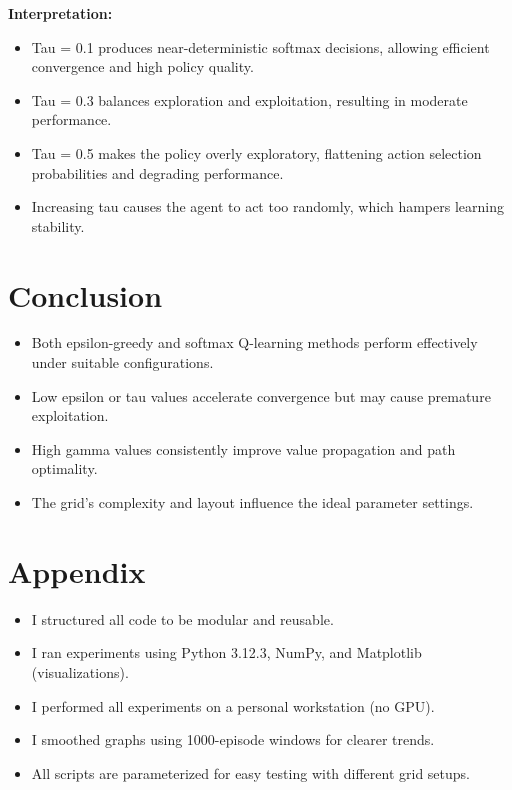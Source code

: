 \documentclass[12pt]{article}
\begin{document}
\textbf{Interpretation:}
\begin{itemize}
  \item Tau = 0.1 produces near-deterministic softmax decisions, allowing efficient convergence and high policy quality.
  \item Tau = 0.3 balances exploration and exploitation, resulting in moderate performance.
  \item Tau = 0.5 makes the policy overly exploratory, flattening action selection probabilities and degrading performance.
  \item Increasing tau causes the agent to act too randomly, which hampers learning stability.
\end{itemize}

\section{Conclusion}
\begin{itemize}
  \item Both epsilon-greedy and softmax Q-learning methods perform effectively under suitable configurations.
  \item Low epsilon or tau values accelerate convergence but may cause premature exploitation.
  \item High gamma values consistently improve value propagation and path optimality.
  \item The grid's complexity and layout influence the ideal parameter settings.
\end{itemize}

\section{Appendix}
\begin{itemize}
  \item I structured all code to be modular and reusable.
  \item I ran experiments using Python 3.12.3, NumPy, and Matplotlib (visualizations).
  \item I performed all experiments on a personal workstation (no GPU).
  \item I smoothed graphs using 1000-episode windows for clearer trends.
  \item All scripts are parameterized for easy testing with different grid setups.
\end{itemize}
\end{document}
